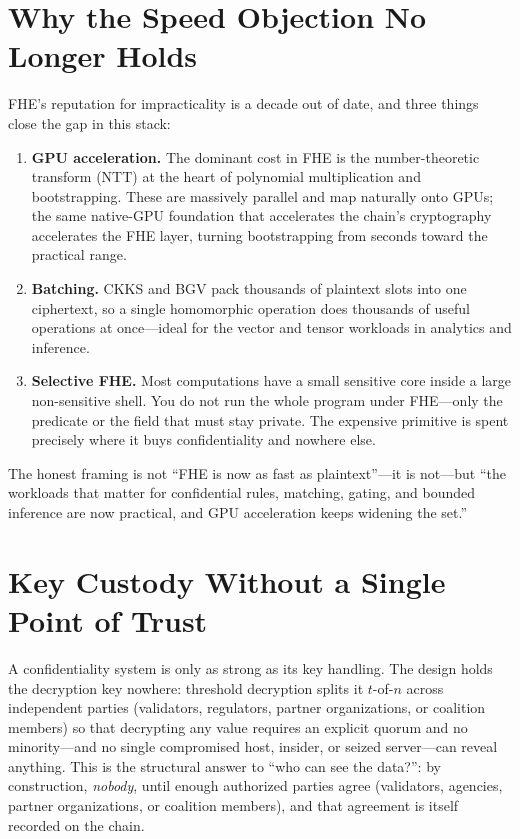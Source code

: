 \documentclass[11pt,letterpaper]{article}
\begin{document}
\section{Why the Speed Objection No Longer Holds}
\label{sec:speed}

FHE's reputation for impracticality is a decade out of date, and three things close
the gap in this stack:

\begin{enumerate}
  \item \textbf{GPU acceleration.} The dominant cost in FHE is the
  number-theoretic transform (NTT) at the heart of polynomial multiplication and
  bootstrapping. These are massively parallel and map naturally onto GPUs; the same
  native-GPU foundation that accelerates the chain's cryptography accelerates the
  FHE layer, turning bootstrapping from seconds toward the practical range.
  \item \textbf{Batching.} CKKS and BGV pack thousands of plaintext slots into one
  ciphertext, so a single homomorphic operation does thousands of useful operations
  at once---ideal for the vector and tensor workloads in analytics and inference.
  \item \textbf{Selective FHE.} Most computations have a small sensitive core inside
  a large non-sensitive shell. You do not run the whole program under FHE---only the
  predicate or the field that must stay private. The expensive primitive is spent
  precisely where it buys confidentiality and nowhere else.
\end{enumerate}

The honest framing is not ``FHE is now as fast as plaintext''---it is not---but
``the workloads that matter for confidential rules, matching, gating, and bounded
inference are now practical, and GPU acceleration keeps widening the set.''

\section{Key Custody Without a Single Point of Trust}

A confidentiality system is only as strong as its key handling. The design holds
the decryption key nowhere: threshold decryption splits it $t$-of-$n$ across
independent parties (validators, regulators, partner organizations, or coalition
members) so that decrypting
any value requires an explicit quorum and no minority---and no single compromised
host, insider, or seized server---can reveal anything. This is the structural
answer to ``who can see the data?'': by construction, \emph{nobody}, until enough
authorized parties agree (validators, agencies, partner organizations, or
coalition members), and that agreement is itself recorded on the chain.
\end{document}
